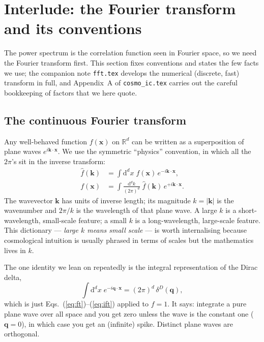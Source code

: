 \documentclass[12pt]{article}
\newcommand{\bk}{\mathbf{k}}
\newcommand{\bx}{\mathbf{x}}
\newcommand{\bq}{\mathbf{q}}
\newcommand{\code}[1]{\texttt{#1}}
\begin{document}
\section{Interlude: the Fourier transform and its conventions}
\label{sec:fourier}

The power spectrum is the correlation function seen in Fourier space, so
we need the Fourier transform first.  This section fixes conventions and
states the few facts we use; the companion note \code{fft.tex} develops
the numerical (discrete, fast) transform in full, and Appendix~A of
\code{cosmo\_ic.tex} carries out the careful bookkeeping of factors that
we here quote.

\subsection{The continuous Fourier transform}
\label{sec:cft}

Any well-behaved function $f(\bx)$ on $\mathbb R^d$ can be written as a
superposition of plane waves $e^{i\bk\cdot\bx}$.  We use the symmetric
``physics'' convention, in which all the $2\pi$'s sit in the inverse
transform:
\begin{align}
  \hat f(\bk) &= \int \mathrm d^d x\; f(\bx)\,e^{-i\bk\cdot\bx},
  \label{eq:ft}\\
  f(\bx) &= \int \frac{\mathrm d^d k}{(2\pi)^d}\; \hat f(\bk)\,e^{+i\bk\cdot\bx}.
  \label{eq:ift}
\end{align}
The wavevector $\bk$ has units of inverse length; its magnitude $k =
|\bk|$ is the wavenumber and $2\pi/k$ is the wavelength of that plane
wave.  A large $k$ is a short-wavelength, small-scale feature; a small
$k$ is a long-wavelength, large-scale feature.  This dictionary ---
\emph{large $k$ means small scale} --- is worth internalising because
cosmological intuition is usually phrased in terms of scales but the
mathematics lives in $k$.

The one identity we lean on repeatedly is the integral representation of
the Dirac delta,
\begin{equation}
  \int \mathrm d^d x\; e^{-i\bq\cdot\bx} = (2\pi)^d\,\delta^D(\bq),
  \label{eq:delta-rep}
\end{equation}
which is just Eqs.~(\ref{eq:ft})--(\ref{eq:ift}) applied to $f = 1$.  It
says: integrate a pure plane wave over all space and you get zero unless
the wave is the constant one ($\bq = 0$), in which case you get an
(infinite) spike.  Distinct plane waves are orthogonal.
\end{document}
